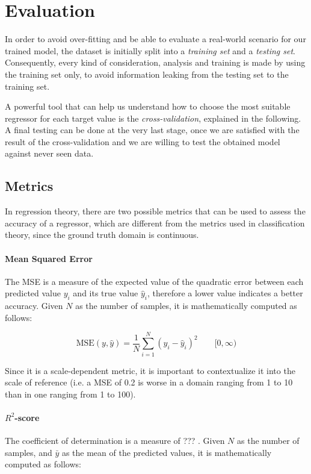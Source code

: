 \section{Evaluation}

In order to avoid over-fitting and be able to evaluate a real-world scenario for our trained model, the dataset is initially split into a \emph{training set} and a \emph{testing set}.
Consequently, every kind of consideration, analysis and training is made by using the training set only, to avoid information leaking from the testing set to the training set.

A powerful tool that can help us understand how to choose the most suitable regressor for each target value is the \emph{cross-validation}, explained in the following.
A final testing can be done at the very last stage, once we are satisfied with the result of the cross-validation and we are willing to test the obtained model against never seen data.

\subsection{Metrics}

In regression theory, there are two possible metrics that can be used to assess the accuracy of a regressor, which are different from the metrics used in classification theory, since the ground truth domain is continuous.

\paragraph{Mean Squared Error}
The MSE is a measure of the expected value of the quadratic error between each predicted value $y_i$ and its true value $\hat{y}_i$, therefore a lower value indicates a better accuracy.
Given $N$ as the number of samples, it is mathematically computed as follows:

\[
	\text{MSE}(y, \hat{y}) = \frac{1}{N} \sum_{i=1}^{N} (y_i - \hat{y}_i)^2
	\qquad [0, \infty)
\]

Since it is a scale-dependent metric, it is important to contextualize it into the scale of reference (i.e. a MSE of 0.2 is worse in a domain ranging from 1 to 10 than in one ranging from 1 to 100).

\paragraph{$R^2$-score}
The coefficient of determination is a measure of ??? . Given $N$ as the number of samples, and $\bar{y}$ as the mean of the predicted values, it is mathematically computed as follows:

